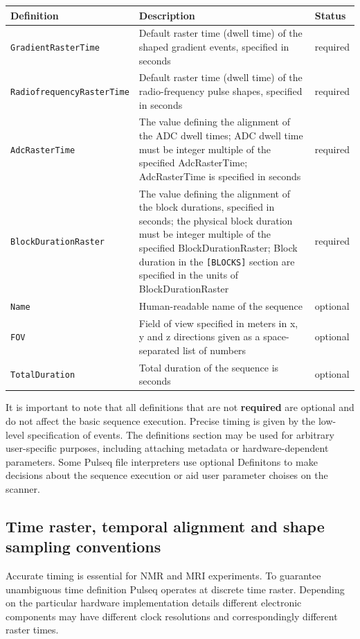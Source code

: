 \documentclass{article}
\begin{document}
\begin{tabularx}{\textwidth}{lXl}
\toprule
Definition & Description & Status\\
\midrule
\verb.GradientRasterTime. & Default raster time (dwell time) of the shaped gradient events, specified in seconds & required \\
\verb.RadiofrequencyRasterTime. & Default raster time (dwell time) of the radio-frequency pulse shapes, specified in seconds & required \\
\verb.AdcRasterTime. & The value defining the alignment of the ADC dwell times; ADC dwell time must be integer multiple of the specified AdcRasterTime; AdcRasterTime is specified in seconds & required \\
\verb.BlockDurationRaster. & The value defining the alignment of the block durations, specified in seconds; the physical block duration must be integer multiple of the specified BlockDurationRaster; Block duration in the \verb.[BLOCKS]. section are specified in the units of BlockDurationRaster  & required\\
\verb.Name. & Human-readable name of the sequence & optional \\
\verb.FOV. & Field of view specified in meters in x, y and z directions given as a space-separated list of numbers & optional\\
\verb.TotalDuration. & Total duration of the sequence is seconds & optional\\
\bottomrule
\end{tabularx}

It is important to note that all definitions that are not  \textbf{required} are optional and do not affect the basic sequence execution. Precise timing is given by the low-level specification of events. The definitions section may be used for arbitrary user-specific purposes, including attaching metadata or hardware-dependent parameters. Some Pulseq file interpreters use optional Definitons to make decisions about the sequence execution or aid user parameter choises on the scanner.

\subsection{Time raster, temporal alignment and shape sampling conventions}\label{subsec:timing}

Accurate timing is essential for NMR and MRI experiments. To guarantee 	
unambiguous time definition Pulseq operates at discrete time raster. Depending on the particular hardware implementation details different electronic components may have different clock resolutions and correspondingly different raster times. 
\end{document}
